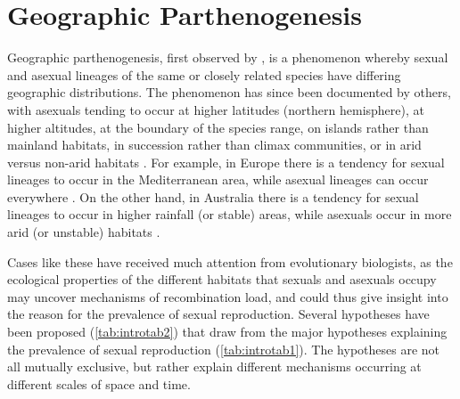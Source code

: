 \section{Geographic Parthenogenesis}
\begin{sloppypar}
Geographic parthenogenesis, first observed by \textcite{vandel_parthenogen`ese_1928,vandel_parthenogen`ese_1940}, is a phenomenon whereby sexual and asexual lineages of the same or closely related species have differing geographic distributions. The phenomenon has since been documented by others, with asexuals tending to occur at higher latitudes (northern hemisphere), at higher altitudes, at the boundary of the species range, on islands rather than mainland habitats, in succession rather than climax communities, or in arid versus non-arid habitats \parencite{glesener_sexuality_1978,bell_masterpiece_1982,lynch_destabilizing_1984,kearney_why_2003,parker_jr_geographic_2002}. For example, in Europe there is a tendency for sexual lineages to occur in the Mediterranean area, while asexual lineages can occur everywhere \parencite{vandel_parthenogen`ese_1928}. On the other hand, in Australia there is a tendency for sexual lineages to occur in higher rainfall (or stable) areas, while asexuals occur in more arid (or unstable) habitats \parencite{kearney_why_2003}.
\end{sloppypar}

Cases like these have received much attention from evolutionary biologists, as the ecological properties of the different habitats that sexuals and asexuals occupy may uncover mechanisms of recombination load, and could thus give insight into the reason for the prevalence of sexual reproduction. Several hypotheses have been proposed (\cref{tab:introtab2}) that draw from the major hypotheses explaining the prevalence of sexual reproduction (\cref{tab:introtab1}). The hypotheses are not all mutually exclusive, but rather explain different mechanisms occurring at different scales of space and time.

